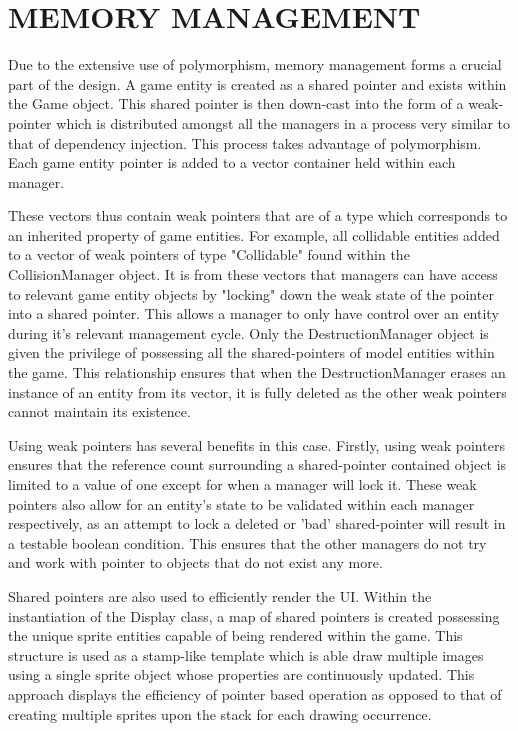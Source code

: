 \documentclass[10pt,twocolumn]{witseiepaper}
\begin{document}
%
\section{MEMORY MANAGEMENT}

Due to the extensive use of polymorphism, memory management forms a crucial part of the design. A game entity is created as a shared pointer and exists within the Game object. This shared pointer is then down-cast into the form of a weak-pointer which is distributed amongst all the managers in a process very similar to that of dependency injection. This process takes advantage of polymorphism. Each game entity pointer is added to a vector container held within each manager. 

These vectors thus contain weak pointers that are of a type which corresponds to an inherited property of game entities. For example, all collidable entities added to a vector of weak pointers of type "Collidable" found within the CollisionManager object. It is from these vectors that managers can have access to relevant game entity objects by "locking" down the weak state of the pointer into a shared pointer. This allows a manager to only have control over an entity during it's relevant management cycle. Only the DestructionManager object is given the privilege of possessing all the shared-pointers of model entities within the game. This relationship ensures that when the DestructionManager erases an instance of an entity from its vector, it is fully deleted as the other weak pointers cannot maintain its existence.

Using weak pointers has several benefits in this case. Firstly, using weak pointers ensures that the reference count surrounding a shared-pointer contained object is limited to a value of one except for when a manager will lock it. These weak pointers also allow for an entity's state to be validated within each manager respectively, as an attempt to lock a deleted or 'bad' shared-pointer will result in a testable boolean condition. This ensures that the other managers do not try and work with pointer to objects that do not exist any more.

Shared pointers are also used to efficiently render the UI. Within the instantiation of the Display class, a map of shared pointers is created possessing the unique sprite entities capable of being rendered within the game. This structure is used as a stamp-like template which is able draw multiple images using a single sprite object whose properties are continuously updated. This approach displays the efficiency of pointer based operation as opposed to that of creating multiple sprites upon the stack for each drawing occurrence.
\end{document}

